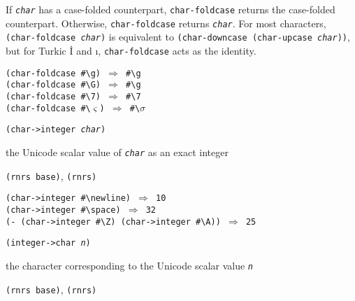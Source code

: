 If \texttt{\textit{char}} has a case-folded counterpart, \texttt{char-foldcase}
returns the case-folded counterpart.
Otherwise, \texttt{char-foldcase} returns \texttt{\textit{char}}.
For most characters, \texttt{(char-foldcase \textit{char})} is
equivalent to \texttt{(char-downcase (char-upcase \textit{char}))},
but for Turkic İ and ı,
\texttt{char-foldcase} acts as the identity.


\begin{alltt}
(char-foldcase \#{}\textbackslash{}g) \(\Rightarrow\) \#{}\textbackslash{}g
(char-foldcase \#{}\textbackslash{}G) \(\Rightarrow\) \#{}\textbackslash{}g
(char-foldcase \#{}\textbackslash{}7) \(\Rightarrow\) \#{}\textbackslash{}7
(char-foldcase \#{}\textbackslash{}\(\varsigma\)) \(\Rightarrow\) \#{}\textbackslash{}\(\sigma\)
\end{alltt}

\begin{description}

\label{objects_s210}\item[procedure] \texttt{(char-\textgreater{}integer \textit{char})}



\item[returns] the Unicode scalar value of \texttt{\textit{char}} as an exact integer


\item[libraries] \texttt{(rnrs base)}, \texttt{(rnrs)}
\end{description}


\begin{alltt}
(char-\textgreater{}integer \#{}\textbackslash{}newline) \(\Rightarrow\) 10
(char-\textgreater{}integer \#{}\textbackslash{}space) \(\Rightarrow\) 32
(- (char-\textgreater{}integer \#{}\textbackslash{}Z) (char-\textgreater{}integer \#{}\textbackslash{}A)) \(\Rightarrow\) 25
\end{alltt}

\begin{description}

\label{objects_s211}\item[procedure] \texttt{(integer-\textgreater{}char \textit{n})}



\item[returns] the character corresponding to the Unicode scalar value \texttt{\textit{n}}


\item[libraries] \texttt{(rnrs base)}, \texttt{(rnrs)}
\end{description}

